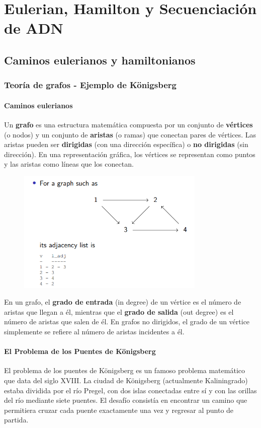 \chapter{Eulerian, Hamilton y Secuenciación de ADN}
\section{Caminos eulerianos y hamiltonianos}
\subsection{Teoría de grafos - Ejemplo de Königsberg}
\subsubsection{Caminos eulerianos}
Un \textbf{grafo} es una estructura matemática compuesta por un conjunto de \textbf{vértices} (o nodos) y un conjunto de \textbf{aristas} (o ramas) que conectan pares de vértices. Las aristas pueden ser \textbf{dirigidas} (con una dirección específica) o \textbf{no dirigidas} (sin dirección). En una representación gráfica, los vértices se representan como puntos y las aristas como líneas que los conectan.

\begin{figure}[h]
\centering
\includegraphics[width = 0.8\textwidth]{figs/graph.png}
\end{figure}

En un grafo, el \textbf{grado de entrada} (in degree) de un vértice es el número de aristas que llegan a él, mientras que el \textbf{grado de salida} (out degree) es el número de aristas que salen de él. En grafos no dirigidos, el grado de un vértice simplemente se refiere al número de aristas incidentes a él.

\subsubsection{El Problema de los Puentes de Königsberg}
El problema de los puentes de Königsberg es un famoso problema matemático que data del siglo XVIII. La ciudad de Königsberg (actualmente Kaliningrado) estaba dividida por el río Pregel, con dos islas conectadas entre sí y con las orillas del río mediante siete puentes. El desafío consistía en encontrar un camino que permitiera cruzar cada puente exactamente una vez y regresar al punto de partida.

